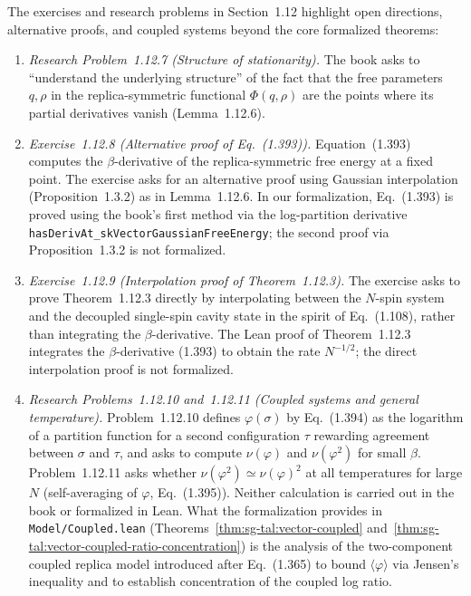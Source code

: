 \begin{remark}\label{rem:sg-tal:vector-exercises-problems}
The exercises and research problems in Section~1.12 highlight open directions, alternative proofs,
and coupled systems beyond the core formalized theorems:
\begin{enumerate}
\item \emph{Research Problem~1.12.7 (Structure of stationarity).} The book asks to ``understand the
underlying structure'' of the fact that the free parameters $q,\rho$ in the replica-symmetric
functional $\Phi(q,\rho)$ are the points where its partial derivatives vanish (Lemma~1.12.6).
\item \emph{Exercise~1.12.8 (Alternative proof of Eq.~(1.393)).} Equation~(1.393) computes the
$\beta$-derivative of the replica-symmetric free energy at a fixed point. The exercise asks for an
alternative proof using Gaussian interpolation (Proposition~1.3.2) as in Lemma~1.12.6. In our
formalization, Eq.~(1.393) is proved using the book's first method via the log-partition derivative
\texttt{hasDerivAt\_skVectorGaussianFreeEnergy}; the second proof via Proposition~1.3.2 is not formalized.
\item \emph{Exercise~1.12.9 (Interpolation proof of Theorem~1.12.3).} The exercise asks to prove
Theorem~1.12.3 directly by interpolating between the $N$-spin system and the decoupled single-spin
cavity state in the spirit of Eq.~(1.108), rather than integrating the $\beta$-derivative. The Lean
proof of Theorem~1.12.3 integrates the $\beta$-derivative (1.393) to obtain the rate $N^{-1/2}$; the direct
interpolation proof is not formalized.
\item \emph{Research Problems~1.12.10 and~1.12.11 (Coupled systems and general temperature).}
Problem~1.12.10 defines $\varphi(\sigma)$ by Eq.~(1.394) as the logarithm of a partition function for a
second configuration $\tau$ rewarding agreement between $\sigma$ and $\tau$, and asks to compute
$\nu(\varphi)$ and $\nu(\varphi^2)$ for small $\beta$. Problem~1.12.11 asks whether
$\nu(\varphi^2)\simeq\nu(\varphi)^2$ at all temperatures for large $N$ (self-averaging of $\varphi$,
Eq.~(1.395)). Neither calculation is carried out in the book or formalized in Lean. What the formalization
provides in \texttt{Model/Coupled.lean} (Theorems~\ref{thm:sg-tal:vector-coupled}
and~\ref{thm:sg-tal:vector-coupled-ratio-concentration}) is the analysis of the two-component coupled
replica model introduced after Eq.~(1.365) to bound $\langle\varphi\rangle$ via Jensen's inequality and to
establish concentration of the coupled log ratio.
\end{enumerate}
\end{remark}

